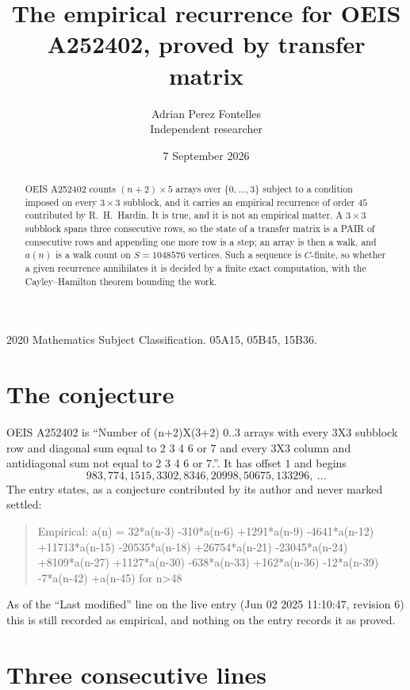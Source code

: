 \documentclass[11pt,a4paper]{article}
\title{The empirical recurrence for OEIS A252402, proved by transfer matrix}
\author{Adrian Perez Fontelles\\ \small Independent researcher}
\date{7 September 2026}
\theoremstyle{plain}
\theoremstyle{definition}
\begin{document}
\maketitle

\begin{abstract}
OEIS A252402 counts $(n+2)\times5$ arrays over $\{0,\dots,3\}$ subject to a condition imposed on
every $3\times3$ subblock, and it carries an empirical recurrence of order $45$
contributed by R.~H.~Hardin. It is true, and it is not an empirical matter. A $3\times3$
subblock spans three consecutive rows, so the state of a transfer matrix is a PAIR of
consecutive rows and appending one more row is a step; an array is then a walk, and
$a(n)$ is a walk count on $S=1048576$ vertices. Such a sequence is $C$-finite, so whether a given
recurrence annihilates it is decided by a finite exact computation, with the Cayley--Hamilton
theorem bounding the work.
\end{abstract}

\noindent\small 2020 Mathematics Subject Classification. 05A15, 05B45, 15B36.\normalsize

\section{The conjecture}

OEIS A252402 is ``Number of (n+2)X(3+2) 0..3 arrays with every 3X3 subblock row and diagonal sum equal to 2 3 4 6 or 7 and every 3X3 column and antidiagonal sum not equal to 2 3 4 6 or 7.''. It has offset $1$ and begins
\[
983, 774, 1515, 3302, 8346, 20998, 50675, 133296,\ \dots
\]
The entry states, as a conjecture contributed by its author and never marked settled:
\begin{quote}
Empirical: a(n) = 32*a(n-3) -310*a(n-6) +1291*a(n-9) -4641*a(n-12) +11713*a(n-15) -20535*a(n-18) +26754*a(n-21) -23045*a(n-24) +8109*a(n-27) +1127*a(n-30) -638*a(n-33) +162*a(n-36) -12*a(n-39) -7*a(n-42) +a(n-45) for n>48
\end{quote}
As of the ``Last modified'' line on the live entry (Jun 02 2025 11:10:47, revision 6) this is still
recorded as empirical, and nothing on the entry records it as proved.

\section{Three consecutive lines}
\end{document}

